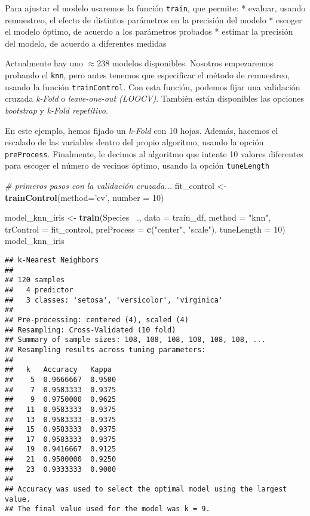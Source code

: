 \documentclass[]{book}
\newenvironment{Shaded}{\begin{snugshade}}{\end{snugshade}}
\newcommand{\CommentTok}[1]{\textcolor[rgb]{0.56,0.35,0.01}{\textit{#1}}}
\newcommand{\DataTypeTok}[1]{\textcolor[rgb]{0.13,0.29,0.53}{#1}}
\newcommand{\DecValTok}[1]{\textcolor[rgb]{0.00,0.00,0.81}{#1}}
\newcommand{\KeywordTok}[1]{\textcolor[rgb]{0.13,0.29,0.53}{\textbf{#1}}}
\newcommand{\NormalTok}[1]{#1}
\newcommand{\OperatorTok}[1]{\textcolor[rgb]{0.81,0.36,0.00}{\textbf{#1}}}
\newcommand{\StringTok}[1]{\textcolor[rgb]{0.31,0.60,0.02}{#1}}
\begin{document}
Para ajustar el modelo usaremos la función \texttt{train}, que permite:
* evaluar, usando remuestreo, el efecto de distintos parámetros en la precisión del modelo
* escoger el modelo óptimo, de acuerdo a los parámetros probados
* estimar la precisión del modelo, de acuerdo a diferentes medidas

Actualmente hay uno \(\approx 238\) modelos disponibles. Nosotros empezaremos probando el \texttt{knn}, pero antes tenemos que especificar el método de remuestreo, usando la función \texttt{trainControl}. Con esta función, podemos fijar una validación cruzada \emph{k-Fold} o \emph{leave-one-out (LOOCV)}. También están disponibles las opciones \emph{bootstrap} y \emph{k-Fold repetitivo}.

En este ejemplo, hemos fijado un \emph{k-Fold} con 10 hojas. Además, hacemos el escalado de las variables dentro del propio algoritmo, usando la opción \texttt{preProcess}. Finalmente, le decimos al algoritmo que intente 10 valores diferentes para escoger el número de vecinos óptimo, usando la opción \texttt{tuneLength}

\begin{Shaded}
\begin{Highlighting}[]
\CommentTok{# primeros pasos con la validación cruzada...}
\NormalTok{fit_control <-}\StringTok{ }\KeywordTok{trainControl}\NormalTok{(}\DataTypeTok{method=}\StringTok{'cv'}\NormalTok{, }\DataTypeTok{number =} \DecValTok{10}\NormalTok{)  }

\NormalTok{model_knn_iris <-}\StringTok{ }\KeywordTok{train}\NormalTok{(Species }\OperatorTok{~}\NormalTok{., }
                       \DataTypeTok{data =}\NormalTok{ train_df, }
                       \DataTypeTok{method =} \StringTok{"knn"}\NormalTok{, }
                       \DataTypeTok{trControl =}\NormalTok{ fit_control, }
                       \DataTypeTok{preProcess =} \KeywordTok{c}\NormalTok{(}\StringTok{"center"}\NormalTok{, }\StringTok{"scale"}\NormalTok{),  }
                       \DataTypeTok{tuneLength =} \DecValTok{10}\NormalTok{)}
\NormalTok{model_knn_iris}
\end{Highlighting}
\end{Shaded}

\begin{verbatim}
## k-Nearest Neighbors 
## 
## 120 samples
##   4 predictor
##   3 classes: 'setosa', 'versicolor', 'virginica' 
## 
## Pre-processing: centered (4), scaled (4) 
## Resampling: Cross-Validated (10 fold) 
## Summary of sample sizes: 108, 108, 108, 108, 108, 108, ... 
## Resampling results across tuning parameters:
## 
##   k   Accuracy   Kappa 
##    5  0.9666667  0.9500
##    7  0.9583333  0.9375
##    9  0.9750000  0.9625
##   11  0.9583333  0.9375
##   13  0.9583333  0.9375
##   15  0.9583333  0.9375
##   17  0.9583333  0.9375
##   19  0.9416667  0.9125
##   21  0.9500000  0.9250
##   23  0.9333333  0.9000
## 
## Accuracy was used to select the optimal model using the largest value.
## The final value used for the model was k = 9.
\end{verbatim}
\end{document}
